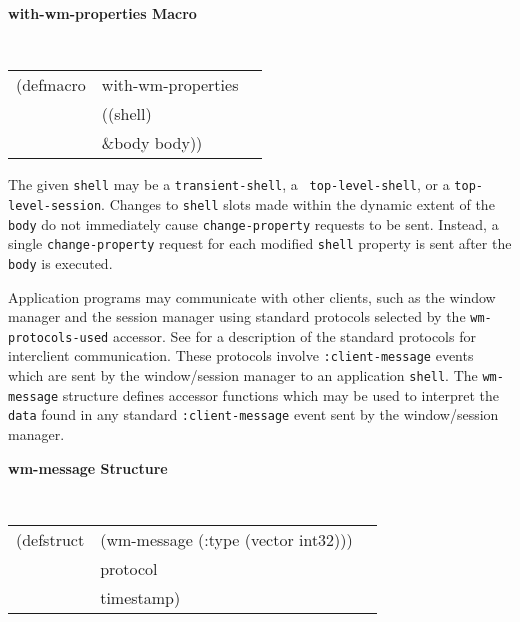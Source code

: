 \pagebreak
{\samepage
{\large {\bf with-wm-properties \hfill Macro}} 
\begin{flushright} \parbox[t]{6.125in}{
\tt
\begin{tabular}{lll}
\raggedright
(defmacro & with-wm-properties & \\ 
& ((shell)\\
& \&body body))
\end{tabular}
\rm

}\end{flushright}}

\begin{flushright} \parbox[t]{6.125in}{
The given {\tt shell} may be a {\tt transient-shell}, a {\tt
top-level-shell}, or a {\tt top-level-session}. Changes to {\tt shell}
slots made within the dynamic extent of the {\tt body} do not
immediately cause {\tt change-property} requests to be sent. Instead, a single
{\tt change-property} request for each modified {\tt shell} property is sent
after the {\tt body} is executed.

}\end{flushright}

Application
programs may communicate with other clients, such as the window manager and the
session manager  using standard
protocols selected by the {\tt wm-protocols-used}
accessor.  See \cite{icccm} for a description of the standard protocols for
interclient communication.  These protocols involve {\tt :client-message} events
which are sent by the window/session manager to an application {\tt shell}.  The
{\tt wm-message} structure defines accessor functions which may be used to
interpret the
{\tt data} found in any standard {\tt :client-message} event sent by the
window/session manager.

{\samepage
{\large {\bf wm-message \hfill Structure}} 
\begin{flushright} 
\parbox[t]{6.125in}{
\tt
\begin{tabular}{lll}
(defstruct & (wm-message (:type (vector int32))) \\
           & protocol \\
           & timestamp)\\
\end{tabular}
\rm

}\end{flushright}}

